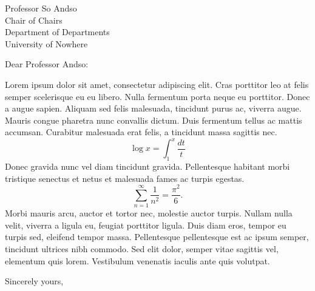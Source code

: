 \documentclass[letterpaper]{mscsletter2015}
\begin{document}
\begin{letter}{
Professor So Andso\\
Chair of Chairs\\
Department of Departments\\
University of Nowhere\\
}

\opening{Dear Professor Andso:}

Lorem ipsum dolor sit amet, consectetur adipiscing elit. Cras
porttitor leo at felis semper scelerisque eu eu libero. Nulla
fermentum porta neque eu porttitor. Donec a augue sapien. Aliquam sed
felis malesuada, tincidunt purus ac, viverra augue. Mauris congue
pharetra nunc convallis dictum. Duis fermentum tellus ac mattis
accumsan. Curabitur malesuada erat felis, a tincidunt massa sagittis
nec.
$$\log x = \int_1^x\frac{dt}{t}$$
Donec gravida nunc vel diam tincidunt gravida. Pellentesque habitant
morbi tristique senectus et netus et malesuada fames ac turpis
egestas.
$$\sum_{n=1}^\infty\frac{1}{n^2} = \frac{\pi^2}{6}.$$
Morbi mauris arcu, auctor et tortor nec, molestie auctor
turpis. Nullam nulla velit, viverra a ligula eu, feugiat porttitor
ligula. Duis diam eros, tempor eu turpis sed, eleifend tempor
massa. Pellentesque pellentesque est ac ipsum semper, tincidunt
ultrices nibh commodo. Sed elit dolor, semper vitae sagittis vel,
elementum quis lorem. Vestibulum venenatis iaculis ante quis
volutpat.

\closing{Sincerely yours,}

\end{letter}
\end{document}
